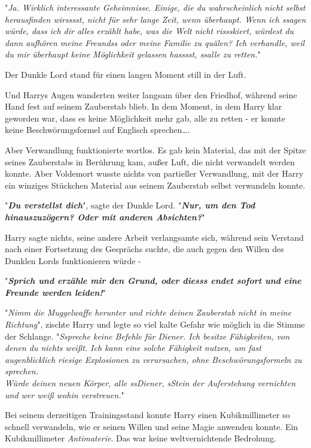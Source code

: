 {"\emph{Ja. Wirklich interessante Geheimnisse. Einige, die du wahrscheinlich nicht selbst herausfinden wirsssst, nicht für sehr lange Zeit, wenn überhaupt. Wenn ich ssagen würde, dass ich dir alles erzählt habe, was die Welt nicht rissskiert, würdest du dann aufhören meine Freundss oder meine Familie zu quälen? Ich verhandle, weil du mir überhaupt keine Möglichkeit gelassen hasssst, ssalle zu retten.}"

Der Dunkle Lord stand für einen langen Moment still in der Luft.

Und Harrys Augen wanderten weiter langsam über den Friedhof, während seine Hand fest auf seinem Zauberstab blieb. In dem Moment, in dem Harry klar geworden war, dass es keine Möglichkeit mehr gab, alle zu retten - er konnte keine Beschwörungsformel auf Englisch sprechen….

Aber Verwandlung funktionierte wortlos. Es gab kein Material, das mit der Spitze seines Zauberstabs in Berührung kam, außer Luft, die nicht verwandelt werden konnte. Aber Voldemort wusste nichts von partieller Verwandlung, mit der Harry ein winziges Stückchen Material aus seinem Zauberstab selbst verwandeln konnte.

"\textbf{\emph{Du verstellst dich}}", sagte der Dunkle Lord. "\textbf{\emph{Nur, um den Tod hinauszuzögern? Oder mit anderen Absichten?}}"

Harry sagte nichts, seine andere Arbeit verlangsamte sich, während sein Verstand nach einer Fortsetzung des Gesprächs suchte, die auch gegen den Willen des Dunklen Lords funktionieren würde -

"\textbf{\emph{Sprich und erzähle mir den Grund, oder diesss endet sofort und eine Freunde werden leiden!}}"

"\emph{Nimm die Muggelwaffe herunter und richte deinen Zauberstab nicht in meine Richtung}", zischte Harry und legte so viel kalte Gefahr wie möglich in die Stimme der Schlange. "\emph{Sspreche keine Befehle für Diener. Ich besitze Fähigkeiten, von denen du nichts weißt. Ich kann eine solche Fähigkeit nutzen, um fast augenblicklich riesige Explosionen zu verursachen, ohne Beschwörungsformeln zu sprechen.\\ Würde deinen neuen Körper, alle ssDiener, sStein der Auferstehung vernichten und wer weiß wohin verstreuen.}"

Bei seinem derzeitigen Trainingsstand konnte Harry einen Kubikmillimeter so schnell verwandeln, wie er seinen Willen und seine Magie anwenden konnte. Ein Kubikmillimeter \emph{Antimaterie}. Das war keine weltvernichtende Bedrohung.

}
